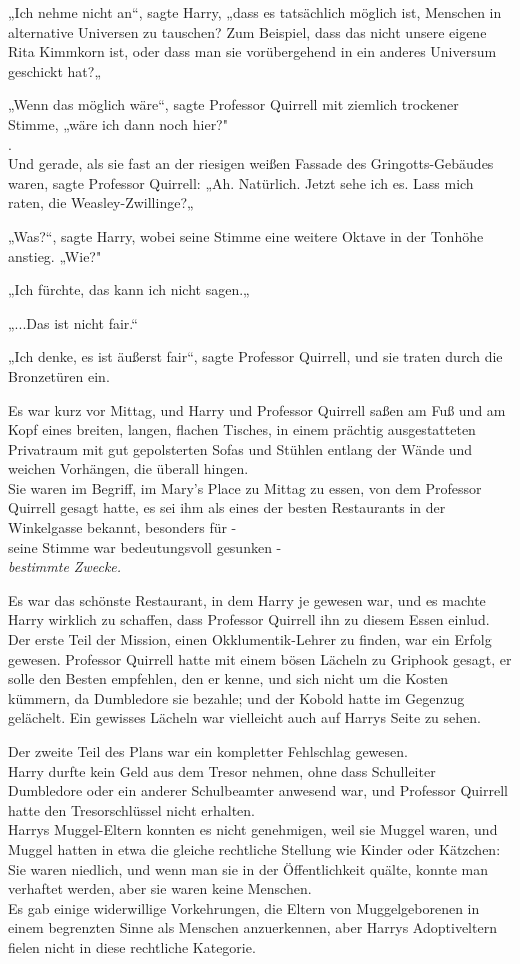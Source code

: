 {„Ich nehme nicht an“, sagte Harry, „dass es tatsächlich möglich ist, Menschen in alternative Universen zu tauschen? Zum Beispiel, dass das nicht unsere eigene Rita Kimmkorn ist, oder dass man sie vorübergehend in ein anderes Universum geschickt hat?„

„Wenn das möglich wäre“, sagte Professor Quirrell mit ziemlich trockener Stimme, „wäre ich dann noch hier?"\\ .\\ Und gerade, als sie fast an der riesigen weißen Fassade des Gringotts-Gebäudes waren, sagte Professor Quirrell: „Ah. Natürlich. Jetzt sehe ich es. Lass mich raten, die Weasley-Zwillinge?„

„Was?“, sagte Harry, wobei seine Stimme eine weitere Oktave in der Tonhöhe anstieg. „Wie?"

„Ich fürchte, das kann ich nicht sagen.„

„...Das ist nicht fair.“

„Ich denke, es ist äußerst fair“, sagte Professor Quirrell, und sie traten durch die Bronzetüren ein.

Es war kurz vor Mittag, und Harry und Professor Quirrell saßen am Fuß und am Kopf eines breiten, langen, flachen Tisches, in einem prächtig ausgestatteten Privatraum mit gut gepolsterten Sofas und Stühlen entlang der Wände und weichen Vorhängen, die überall hingen.\\ Sie waren im Begriff, im Mary's Place zu Mittag zu essen, von dem Professor Quirrell gesagt hatte, es sei ihm als eines der besten Restaurants in der Winkelgasse bekannt, besonders für -\\ seine Stimme war bedeutungsvoll gesunken -\\ \emph{bestimmte Zwecke.}

Es war das schönste Restaurant, in dem Harry je gewesen war, und es machte Harry wirklich zu schaffen, dass Professor Quirrell ihn zu diesem Essen einlud.\\ Der erste Teil der Mission, einen Okklumentik-Lehrer zu finden, war ein Erfolg gewesen. Professor Quirrell hatte mit einem bösen Lächeln zu Griphook gesagt, er solle den Besten empfehlen, den er kenne, und sich nicht um die Kosten kümmern, da Dumbledore sie bezahle; und der Kobold hatte im Gegenzug gelächelt. Ein gewisses Lächeln war vielleicht auch auf Harrys Seite zu sehen.

Der zweite Teil des Plans war ein kompletter Fehlschlag gewesen.\\ Harry durfte kein Geld aus dem Tresor nehmen, ohne dass Schulleiter Dumbledore oder ein anderer Schulbeamter anwesend war, und Professor Quirrell hatte den Tresorschlüssel nicht erhalten.\\ Harrys Muggel-Eltern konnten es nicht genehmigen, weil sie Muggel waren, und Muggel hatten in etwa die gleiche rechtliche Stellung wie Kinder oder Kätzchen: Sie waren niedlich, und wenn man sie in der Öffentlichkeit quälte, konnte man verhaftet werden, aber sie waren keine Menschen.\\ Es gab einige widerwillige Vorkehrungen, die Eltern von Muggelgeborenen in einem begrenzten Sinne als Menschen anzuerkennen, aber Harrys Adoptiveltern fielen nicht in diese rechtliche Kategorie.

}
